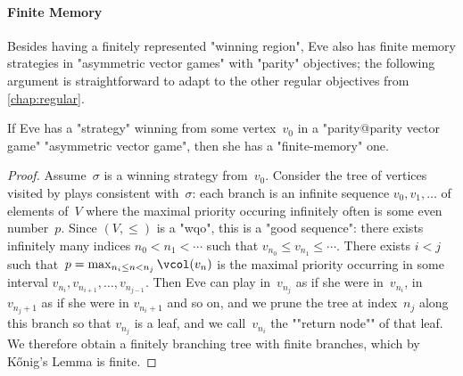 \paragraph{Finite Memory} 
Besides having a finitely represented "winning region", Eve also has
finite memory strategies in "asymmetric vector games" with "parity"
objectives; the following argument is straightforward to adapt to
the other regular objectives from \cref{chap:regular}.
\begin{lemma}\label{11-fact-finmem}
  If Eve has a "strategy" winning from some vertex~$v_0$ in a
  "parity@parity vector game" "asymmetric vector game", then she has a
  "finite-memory" one.
\end{lemma}
\begin{proof}
  Assume~$\sigma$ is a winning strategy from~$v_0$.  Consider the tree
  of vertices visited by plays consistent with~$\sigma$: each branch
  is an infinite sequence $v_0,v_1,\dots$ of elements of~$V$ where the
  maximal priority occuring infinitely often is some even number~$p$.
  Since $(V,{\leq})$ is a "wqo", this is a "good sequence": there
  exists infinitely many indices $n_0<n_1<\cdots$ such that
  $v_{n_0}\leq v_{n_1}\leq\cdots$.  There exists $i<j$ such
  that~$p=\max_{n_i\leq n<n_j}\vcol(v_n)$ is the maximal priority
  occurring in some interval $v_{n_i},v_{n_{i+1}},\dots,v_{n_{j-1}}$.
  Then Eve can play in~$v_{n_j}$ as if she were in~$v_{n_i}$, in
  $v_{n_j+1}$ as if she were in $v_{n_i+1}$ and so on, and we prune
  the tree at index~$n_j$ along this branch so that $v_{n_j}$ is a
  leaf, and we call~$v_{n_i}$ the ""return node"" of that leaf.  We
  therefore obtain a finitely branching tree with finite branches,
  which by K\H{o}nig's Lemma is finite.


\end{proof}

